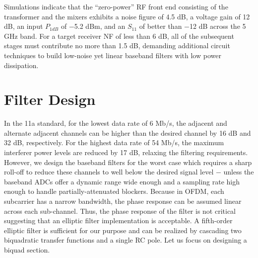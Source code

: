 Simulations indicate that the ``zero-power'' RF front end consisting of the transformer and the mixers exhibits a noise figure of 4.5 dB, a voltage
gain of 12 dB, an input $P_{1dB}$ of $-$5.2 dBm, and an $S_{11}$ of better than $-$12 dB across the 5 GHz band. For a target receiver NF of less than
6 dB, all of the subsequent stages must contribute no more than 1.5 dB, demanding additional circuit techniques to build low-noise yet linear baseband
filters with low power dissipation.

\section{Filter Design}
In the 11a standard, for the lowest data rate of 6 Mb/s, the adjacent and alternate adjacent channels can be higher than the desired channel by 16 dB
and 32 dB, respectively. For the highest data rate of 54 Mb/s, the maximum interferer power levels are reduced by 17 dB, relaxing the filtering
requirements. However, we design the baseband filters for the worst case which requires a sharp roll-off to reduce these channels to well below the
desired signal level $-$ unless the baseband ADCs offer a dynamic range wide enough and a sampling rate high enough to handle partially-attenuated
blockers. 
Because in OFDM, each subcarrier has a narrow bandwidth, the phase response can be assumed linear across each sub-channel. Thus, the phase response
of the filter is not critical suggesting that an elliptic filter implementation is acceptable. A fifth-order elliptic filter is sufficient for our
purpose and can be realized by cascading two biquadratic transfer functions and a single RC pole. Let us focus on designing a biquad section. 


